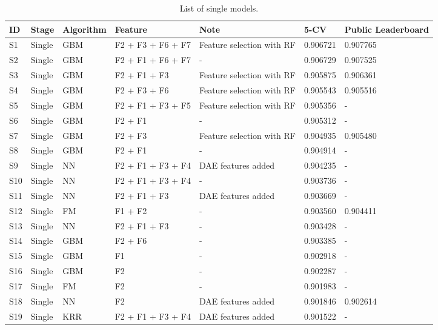 \begin{table*}[t]
\begin{center}
    \begin{minipage}{\textwidth}
    {
    \caption{List of single models.}
      \small
      \hfill{}
\begin{tabular}{lllllll}
ID	& Stage	& Algorithm 	& Feature				& Note					& 5-CV		& Public Leaderboard \\ 
\hline
S1 	& Single	& GBM 		& F2 + F3 + F6 + F7		& Feature selection with RF	& 0.906721	& 0.907765 \\
S2 	& Single 	& GBM		& F2 + F1 + F6 + F7 		& -						& 0.906729	& 0.907525\\
S3 	& Single	& GBM  		& F2 + F1 + F3 			& Feature selection with RF	& 0.905875 	& 0.906361 \\
S4 	& Single	& GBM		& F2 + F3 + F6			& Feature selection with RF	& 0.905543	& 0.905516 \\
S5 	& Single	& GBM		& F2 + F1 + F3 + F5		& Feature selection with RF	& 0.905356	& - \\
S6	& Single	& GBM		& F2 + F1				& -						& 0.905312	& - \\
S7	& Single	& GBM		& F2 + F3				& Feature selection with RF	& 0.904935	& 0.905480 \\
S8	& Single	& GBM		& F2 + F1				& -						& 0.904914	& - \\
S9	& Single	& NN		& F2 + F1 + F3 + F4 		& DAE features	 added		& 0.904235 	& - \\
S10	& Single	& NN	 	& F2 + F1 + F3 + F4 		& -						& 0.903736 	& - \\
S11	& Single	& NN	 	& F2 + F1 + F3 			& DAE features	 added		& 0.903669	& - \\
S12	& Single	& FM 		& F1 + F2 			& -						& 0.903560	& 0.904411 \\
S13	& Single	& NN		& F2 + F1 + F3 			& -						& 0.903428	& - \\
S14	& Single	& GBM		& F2 + F6				& -						& 0.903385	& - \\
S15 	& Single	& GBM		& F1					& -						& 0.902918	& - \\
S16 	& Single	& GBM		& F2 				& - 						& 0.902287	& - \\
S17	& Single	& FM		& F2					& -						& 0.901983	& - \\
S18	& Single	& NN		& F2					& DAE features	 added		& 0.901846	& 0.902614 \\
S19	& Single	& KRR		& F2 + F1 + F3 + F4		& DAE features	 added		& 0.901522	& - \\

\end{tabular}}
\end{minipage}
\end{center}
\end{table*}
